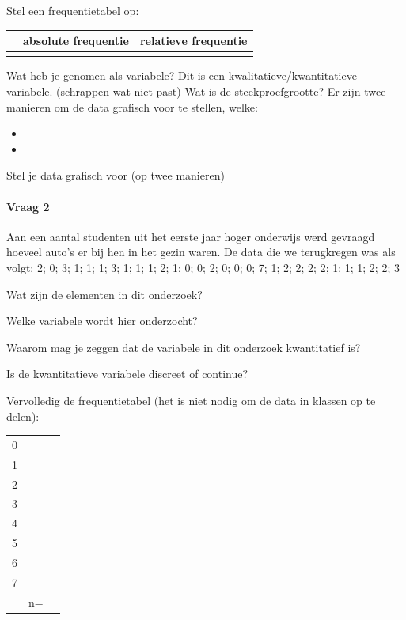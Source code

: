 \documentclass[12pt,twoside,a4paper]{article}
\begin{document}
Stel een frequentietabel op:
\begin{center}
  \begin{tabular}{p{4cm}|p{4cm}|p{4cm}}
    &absolute frequentie&relatieve frequentie\\
    \hline
    &&\\[6cm]
  \end{tabular}
\end{center}

Wat heb je genomen als variabele? \arulefill
Dit is een kwalitatieve/kwantitatieve variabele. {\tiny (schrappen wat niet past)}
Wat is de steekproefgrootte? \arulefill
Er zijn twee manieren om de data grafisch voor te stellen, welke:
\begin{itemize}
  \item \arule{6cm}
  \item \arule{6cm}
\end{itemize}

\newpage
Stel je data grafisch voor (op twee manieren)

\ruitjes{20cm}

\newpage
\paragraph{Vraag 2}
Aan een aantal studenten uit het eerste jaar hoger onderwijs werd gevraagd hoeveel auto's er bij hen in het gezin waren. De data die we terugkregen was als volgt:
2; 0; 3; 1; 1; 1; 3; 1; 1; 1; 2; 1; 0; 0; 2; 0; 0; 0; 7; 1; 2; 2; 2; 2; 1; 1; 1; 2; 2; 3

Wat zijn de elementen in dit onderzoek? \arulefill

Welke variabele wordt hier onderzocht? \arulefill

Waarom mag je zeggen dat de variabele in dit onderzoek kwantitatief is?

Is de kwantitatieve variabele discreet of continue?

Vervolledig de frequentietabel (het is niet nodig om de data in klassen op te delen):
\begin{center}
  \setlength{\tabcolsep}{7pt}
  \renewcommand{\arraystretch}{1.5}
  \begin{tabular}{p{4cm}|p{4cm}|p{4cm}}
      &    & \\
    \hline
    0 &    & \\
    1 &    & \\
    2 &    & \\
    3 &    & \\
    4 &    & \\
    5 &    & \\
    6 &    & \\
    7 &    & \\
      & n= & \\
  \end{tabular}
\end{center}
\end{document}
